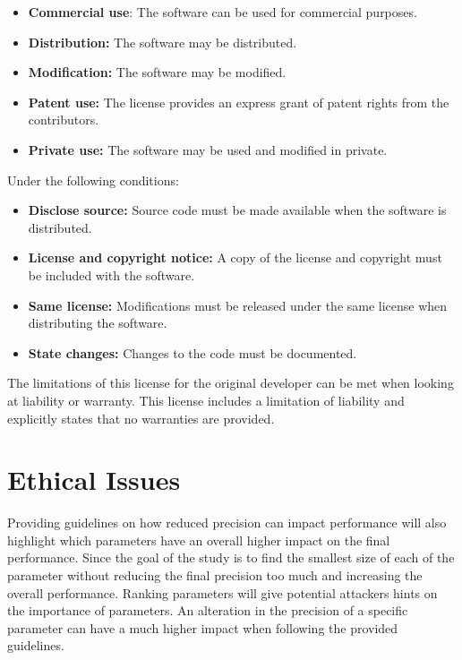 \begin{itemize}
  \item \textbf{Commercial use}: The software can be used for commercial purposes.
  \item \textbf{Distribution:} The software may be distributed.
  \item \textbf{Modification:} The software may be modified.
  \item \textbf{Patent use:} The license provides an express grant of patent rights from the contributors.
  \item \textbf{Private use:} The software may be used and modified in private.
\end{itemize}

Under the following conditions:

\begin{itemize}
  \item \textbf{Disclose source:} Source code must be made available when the software is distributed.
  \item \textbf{License and copyright notice:} A copy of the license and copyright must be included with the software.
  \item \textbf{Same license:} Modifications must be released under the same license when distributing the software.
  \item \textbf{State changes:} Changes to the code must be documented.
\end{itemize}

The limitations of this license for the original developer can be met when looking at liability or warranty. This license includes a limitation of liability and explicitly states that no warranties are provided.



\section{Ethical Issues}

Providing guidelines on how reduced precision can impact performance will also highlight which parameters have an overall higher impact on the final performance. Since the goal of the study is to find the smallest size of each of the parameter without reducing the final precision too much and increasing the overall performance. Ranking parameters will give potential attackers hints on the importance of parameters. An alteration in the precision of a specific parameter can have a much higher impact when following the provided guidelines.

